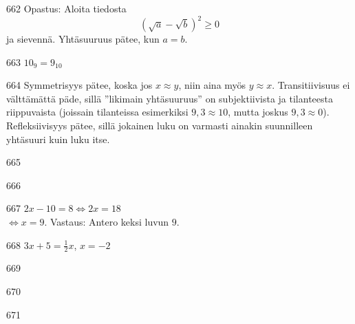 \begin{Vastaus}{662}
     Opastus: Aloita tiedosta \[\left(\sqrt{a}-\sqrt{b}\right)^2 \geq 0\] ja sievennä. Yhtäsuuruus pätee, kun $a = b$.
    
\end{Vastaus}
\begin{Vastaus}{663}
	$10_9=9_{10}$
	
\end{Vastaus}
\begin{Vastaus}{664}
Symmetrisyys pätee, koska jos $x\approx y$, niin aina myös $y\approx x$. Transitiivisuus ei välttämättä päde, sillä ''likimain yhtäsuuruus'' on subjektiivista ja tilanteesta riippuvaista (joissain tilanteissa esimerkiksi $9,3\approx 10$, mutta joskus $9,3 \approx 0$). Refleksiivisyys pätee, sillä jokainen luku on varmasti ainakin suunnilleen yhtäsuuri kuin luku itse.
	
\end{Vastaus}
\begin{Vastaus}{665}
    
\end{Vastaus}
\begin{Vastaus}{666}
    
\end{Vastaus}
\begin{Vastaus}{667}
        $2x-10=8 \Leftrightarrow 2x=18$ \\ $\Leftrightarrow x=9$. Vastaus: Antero keksi luvun $9$.
    
\end{Vastaus}
\begin{Vastaus}{668}
        $3x+5=\frac12x$, $x=-2$
    
\end{Vastaus}
\begin{Vastaus}{669}
    
\end{Vastaus}
\begin{Vastaus}{670}
    
\end{Vastaus}
\begin{Vastaus}{671}
    
\end{Vastaus}
